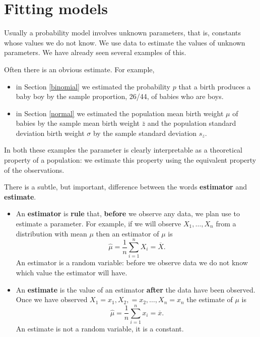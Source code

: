 \documentclass[
  british,
  11pt,
  openany, a4paper]{book}
\providecommand{\tightlist}{%
  \setlength{\itemsep}{0pt}\setlength{\parskip}{0pt}}
\begin{document}
\section{Fitting models}\label{fitting-models}

Usually a probability model involves unknown parameters, that is, constants whose values we do not know. We use data to estimate the values of unknown parameters. We have already seen several examples of this.

Often there is an obvious estimate. For example,

\begin{itemize}
\tightlist
\item
  in Section \ref{binomial} we estimated the probability \(p\) that a birth produces a baby boy by the sample proportion, 26/44, of babies who are boys.\\
\item
  in Section \ref{normal} we estimated the population mean birth weight \(\mu\) of babies by the sample mean birth weight \(\bar{z}\) and the population standard deviation birth weight \(\sigma\) by the sample standard deviation \(s_z\).
\end{itemize}

In both these examples the parameter is clearly interpretable as a theoretical
property of a population: we estimate this property using the equivalent property of the observations.

There is a subtle, but important, difference between the words \textbf{estimator} and \textbf{estimate}.

\begin{itemize}
\tightlist
\item
  An \textbf{estimator} is \textbf{rule} that, \textbf{before} we observe any data, we plan use to estimate a parameter. For example, if we will observe \(X_1, \ldots, X_n\) from a distribution with mean \(\mu\) then an estimator of \(\mu\) is
  \[ \hat{\mu}=\displaystyle\frac1n\sum_{i=1}^n X_i = \overline{X}. \]
  An estimator is a random variable: before we observe data we do not know which value the estimator will have.
\item
  An \textbf{estimate} is the value of an estimator \textbf{after} the data have been observed. Once we have observed \(X_1=x_1, X_2,=x_2, \ldots, X_n=x_n\) the estimate of \(\mu\) is
  \[ \hat{\mu} = \displaystyle\frac1n\sum_{i=1}^n x_i = \overline{x}. \]
  An estimate is not a random variable, it is a constant.
\end{itemize}
\end{document}
